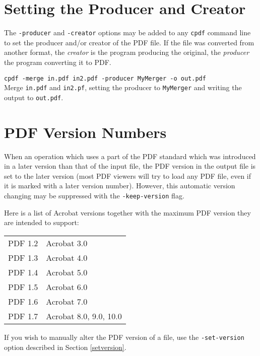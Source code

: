 \documentclass{book}
\begin{document}
\section{Setting the Producer and Creator}

The \texttt{-producer} and \texttt{-creator} options may be added to any \texttt{cpdf} command line to set the producer and/or creator of the PDF file. If the file was converted from another format, the \textit{creator} is the program producing the original, the \textit{producer} the program converting it to PDF.

\begin{framed}
  \small\verb!cpdf -merge in.pdf in2.pdf -producer MyMerger -o out.pdf!\\

  \vspace{2.5mm}
  \noindent Merge \texttt{in.pdf} and \texttt{in2.pf}, setting the producer to \texttt{MyMerger} and writing the output to \texttt{out.pdf}.\end{framed}

\section{PDF Version Numbers}
When an operation which uses a part of the PDF standard which was introduced in
a later version than that of the input file, the PDF version in the output file
is set to the later version (most PDF viewers will try to load any PDF file,
even if it is marked with a later version number). However, this automatic
version changing may be suppressed with the \texttt{-keep-version} flag.

Here is a list of Acrobat versions together with the maximum PDF version they
are intended to support:

\vspace{2mm}
  \begin{tabular}{rl}
     PDF 1.2 & Acrobat 3.0 \\
     PDF 1.3 & Acrobat 4.0 \\
     PDF 1.4 & Acrobat 5.0 \\
     PDF 1.5 & Acrobat 6.0 \\
     PDF 1.6 & Acrobat 7.0 \\
     PDF 1.7 & Acrobat 8.0, 9.0, 10.0
  \end{tabular}
\vspace{2mm}

\noindent If you wish to manually alter the PDF version of a file, use the
\texttt{-set-version} option described in Section \ref{setversion}.
\end{document}
